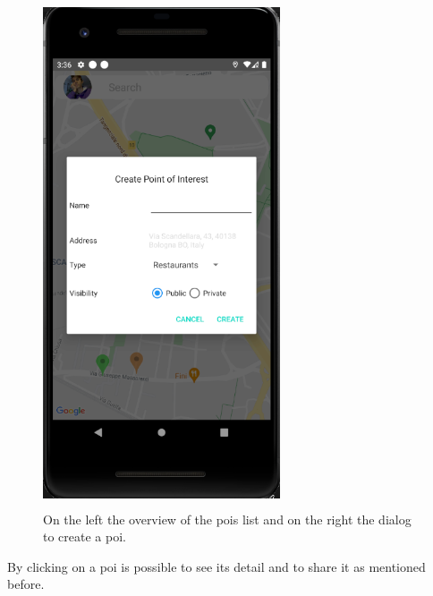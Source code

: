\documentclass[../../main]{subfiles}
\begin{document}
\begin{figure}[H]
    \includegraphics[width=70mm,height=150mm]{images/app/poi/creazione_poi.png}
    \caption{On the left the overview of the pois list and on the right the dialog to create a poi.}
\end{figure}
By clicking on a poi is possible to see its detail and to share it as mentioned before.
\end{document}
